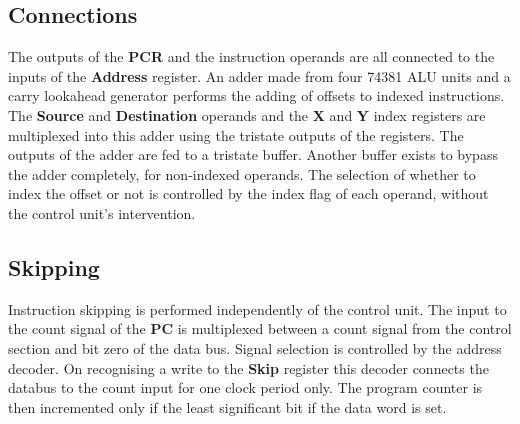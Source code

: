 \subsection{Connections}

The outputs of the {\bf PCR}  and  the instruction operands are 
all connected to the inputs of the {\bf Address} register. 
An adder made from four 74381 ALU units 
and a carry lookahead generator  performs the adding of offsets to 
indexed instructions. 
The {\bf Source} and {\bf Destination}
operands and the {\bf X }
and {\bf Y} index registers are multiplexed into this adder using the tristate 
outputs of the registers.
The outputs of the adder are fed to a tristate buffer.
Another buffer exists to bypass the adder completely, for non-indexed operands.
The selection of whether to index the offset or not is controlled by the index flag of each operand, without   the control unit's intervention.


\subsection{Skipping} 

Instruction skipping is performed independently of the control unit.
The input to the count signal of the {\bf PC} is multiplexed between a count signal from the control section and bit zero of the data bus.
Signal selection is controlled by the address decoder. 
On recognising a write to the {\bf Skip} register this decoder connects
the databus to the count input for one clock period only.
The program counter  is then incremented only if the least significant bit if the data word is set.
